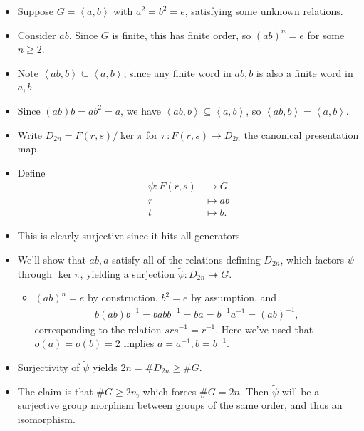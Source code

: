 \begin{solution}

\envlist

\begin{itemize}
\item
  Suppose \(G = \left\langle{ a, b}\right\rangle\) with
  \(a^2 = b^2 = e\), satisfying some unknown relations.
\item
  Consider \(ab\). Since \(G\) is finite, this has finite order, so
  \((ab)^n = e\) for some \(n\geq 2\).
\item
  Note
  \(\left\langle{ab, b}\right\rangle \subseteq \left\langle{a, b}\right\rangle\),
  since any finite word in \(ab, b\) is also a finite word in \(a, b\).
\item
  Since \((ab)b = ab^2 = a\), we have
  \(\left\langle{ab, b}\right\rangle \subseteq \left\langle{a, b}\right\rangle\),
  so
  \(\left\langle{ab, b}\right\rangle = \left\langle{a, b}\right\rangle\).
\item
  Write \(D_{2n} = F(r, s) / \ker \pi\) for \(\pi: F(r, s)\to D_{2n}\)
  the canonical presentation map.
\item
  Define
  \begin{align*}
  \psi: F(r, s) &\to G \\
  r &\mapsto ab \\
  t &\mapsto b
  .\end{align*}
\item
  This is clearly surjective since it hits all generators.
\item
  We'll show that \(ab, a\) satisfy all of the relations defining
  \(D_{2n}\), which factors \(\psi\) through \(\ker \pi\), yielding a
  surjection \(\tilde \psi: D_{2n} \twoheadrightarrow G\).

  \begin{itemize}
  \tightlist
  \item
    \((ab)^n = e\) by construction, \(b^2 = e\) by assumption, and
    \begin{align*}
    b (ab) b^{-1}= babb^{-1}= ba = b^{-1}a^{-1}= (ab)^{-1}
    ,\end{align*}
    corresponding to the relation \(srs^{-1}= r^{-1}\). Here we've used
    that \(o(a) = o(b) = 2\) implies \(a=a^{-1}, b=b^{-1}\).
  \end{itemize}
\item
  Surjectivity of \(\tilde \psi\) yields \(2n = \# D_{2n} \geq \# G\).
\item
  The claim is that \(\# G \geq 2n\), which forces \(\# G = 2n\). Then
  \(\tilde \psi\) will be a surjective group morphism between groups of
  the same order, and thus an isomorphism.


\end{itemize}
\end{solution}
